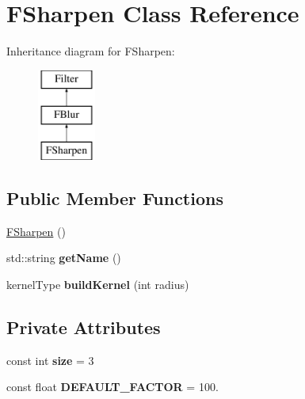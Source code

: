 \hypertarget{classFSharpen}{\section{F\-Sharpen Class Reference}
\label{classFSharpen}
}
Inheritance diagram for F\-Sharpen\-:\begin{figure}[H]
\begin{center}
\leavevmode
\includegraphics[height=3.000000cm]{classFSharpen}
\end{center}
\end{figure}
\subsection*{Public Member Functions}
\begin{DoxyCompactItemize}
\item 
\hyperlink{classFSharpen_adc68195ce6237058f9846439e2c9af49}{F\-Sharpen} ()
\item 
\hypertarget{classFSharpen_ae322ad5626a003ae1e1c6e385dd43ca8}{std\-::string {\bfseries get\-Name} ()}\label{classFSharpen_ae322ad5626a003ae1e1c6e385dd43ca8}

\item 
\hypertarget{classFSharpen_afafd2b34e58d2fb682150be2159d7986}{kernel\-Type {\bfseries build\-Kernel} (int radius)}\label{classFSharpen_afafd2b34e58d2fb682150be2159d7986}

\end{DoxyCompactItemize}
\subsection*{Private Attributes}
\begin{DoxyCompactItemize}
\item 
\hypertarget{classFSharpen_a4e16215737e297abc7b2ee7a7c5bde17}{const int {\bfseries size} = 3}\label{classFSharpen_a4e16215737e297abc7b2ee7a7c5bde17}

\item 
\hypertarget{classFSharpen_a8db2549f63e2c83a877b8db5f886e7c1}{const float {\bfseries D\-E\-F\-A\-U\-L\-T\-\_\-\-F\-A\-C\-T\-O\-R} = 100.}\label{classFSharpen_a8db2549f63e2c83a877b8db5f886e7c1}

\end{DoxyCompactItemize}


